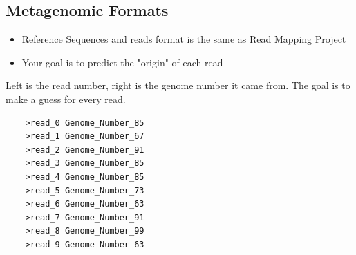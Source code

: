 \documentclass[10pt]{article}
\begin{document}
\subsection*{Metagenomic Formats}
\begin{itemize}
    \item Reference Sequences and reads format is the same as Read Mapping Project
    \item Your goal is to predict the "origin" of each read
\end{itemize}
Left is the read number, right is the genome number it came from.  The goal is to make a guess for every read.
\begin{verbatim}
    >read_0 Genome_Number_85
    >read_1 Genome_Number_67
    >read_2 Genome_Number_91
    >read_3 Genome_Number_85
    >read_4 Genome_Number_85
    >read_5 Genome_Number_73
    >read_6 Genome_Number_63
    >read_7 Genome_Number_91
    >read_8 Genome_Number_99
    >read_9 Genome_Number_63
\end{verbatim}
\end{document}
